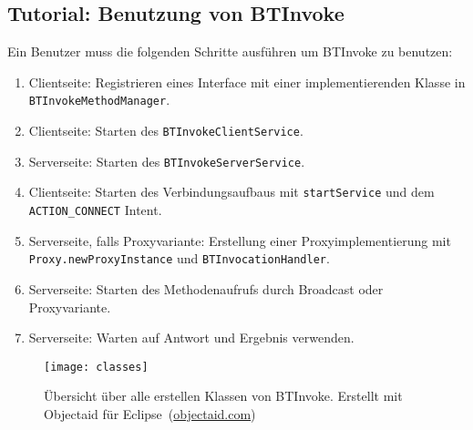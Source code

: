 \subsection{Tutorial: Benutzung von BTInvoke}
%
Ein Benutzer muss die folgenden Schritte ausführen um BTInvoke zu benutzen:
\begin{sloppypar}
\begin{enumerate}
  \item Clientseite: Registrieren eines Interface mit einer implementierenden Klasse in \lstinline{BTInvokeMethodManager}.
  \item Clientseite: Starten des \lstinline{BTInvokeClientService}.
  \item Serverseite: Starten des \lstinline{BTInvokeServerService}.
  \item Clientseite: Starten des Verbindungsaufbaus mit \lstinline{startService} und dem \lstinline{ACTION_CONNECT} Intent.
  \item Serverseite, falls Proxyvariante: Erstellung einer Proxyimplementierung mit \lstinline{Proxy.newProxyInstance} und \lstinline{BTInvocationHandler}.
  \item Serverseite: Starten des Methodenaufrufs durch Broadcast oder Proxyvariante.
  \item Serverseite: Warten auf Antwort und Ergebnis verwenden.
\end{enumerate}
\end{sloppypar}
%
\begin{sidewaysfigure}
  \texttt{[image: classes]}
  \caption{Übersicht über alle erstellen Klassen von BTInvoke. Erstellt mit Objectaid für Eclipse~(\url{objectaid.com})}
\end{sidewaysfigure}
%